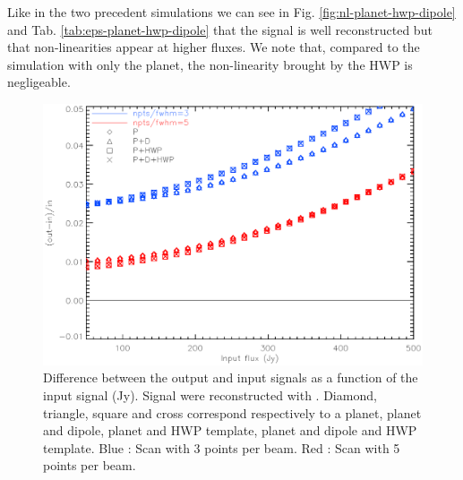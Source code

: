 
Like in the two precedent simulations we can see in Fig. \ref{fig:nl-planet-hwp-dipole} and Tab. \ref{tab:eps-planet-hwp-dipole} that the signal is well reconstructed but that non-linearities appear at higher fluxes. We note that, compared to the simulation with only the planet, the non-linearity brought by the HWP is negligeable.\\

\begin{figure}[h]
\center
	\includegraphics[scale=0.5]{Figures/diff-planet-hwp-dipole-rf.eps}
	\caption{Difference between the output and input signals as a function of the input signal (Jy). Signal were reconstructed with \rf. Diamond, triangle, square and cross correspond respectively to a planet, planet and dipole, planet and HWP template, planet and dipole and HWP template. Blue : Scan with 3 points per beam. Red : Scan with 5 points per beam.}
	\label{fig:diff-rf}
\end{figure}

